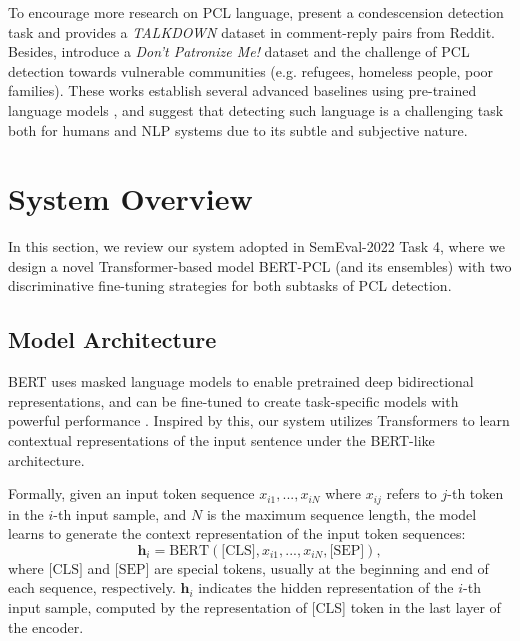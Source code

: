 \documentclass[11pt]{article}
\begin{document}
To encourage more research on PCL language, \citet{DBLP:conf/emnlp/WangP19} present a condescension detection task and provides a \textit{TALKDOWN} dataset in comment-reply pairs from Reddit. Besides, \citet{perez2020don} introduce a \textit{Don’t Patronize Me!} dataset and the challenge of PCL detection towards vulnerable communities (e.g. refugees, homeless people, poor families).
These works establish several advanced baselines using pre-trained language models \citep{DBLP:conf/naacl/DevlinCLT19,DBLP:journals/corr/abs-1907-11692}, and suggest that detecting such language is a challenging task both for humans and NLP systems due to its subtle and subjective nature.



\section{System Overview}




In this section, we review our system adopted in SemEval-2022 Task 4, where we design a novel Transformer-based model BERT-PCL (and its ensembles) with two discriminative fine-tuning strategies for both subtasks of PCL detection. 

\subsection{Model Architecture}
BERT \citep{DBLP:conf/naacl/DevlinCLT19} uses masked language models to enable pretrained deep bidirectional representations, and can be fine-tuned to create task-specific models with powerful performance \citep{DBLP:conf/pkdd/WeiHZTZWHH20,DBLP:conf/seke/HuW20}.
Inspired by this, our system utilizes Transformers \citep{vaswani2017attention} to learn contextual representations of the input sentence under the BERT-like architecture.


Formally, given an input token sequence
$x_{i1}, ..., x_{iN}$ where $x_{ij}$ refers to $j$-th token in the $i$-th input sample, and $N$ is the maximum sequence length, the model learns to generate the context representation of the input token sequences: 
\begin{equation}
    \mathbf{h}_i = \text{BERT}(\text{[CLS]}, x_{i1}, ..., x_{iN}, \text{[SEP]}),
\end{equation}
where $\text{[CLS]}$ and $\text{[SEP]}$ are special tokens, usually at the beginning and end of each sequence, respectively.
$\mathbf{h}_i$ indicates the hidden representation of the $i$-th input sample, computed by the representation of [CLS] token in the last layer of the encoder. 
\end{document}
